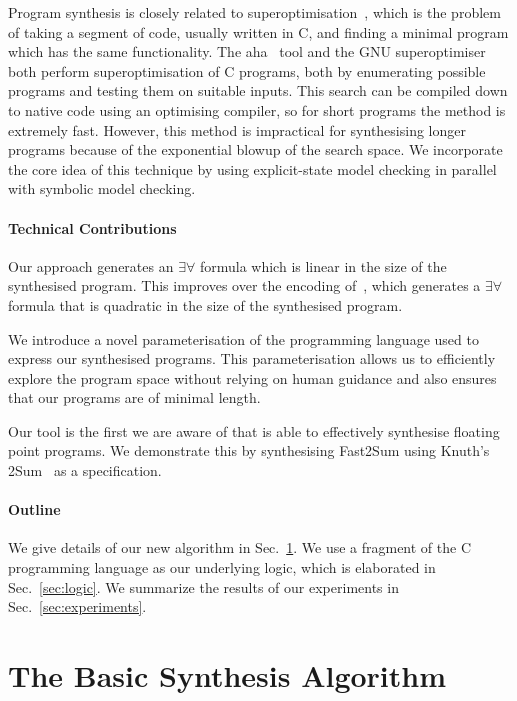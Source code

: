 \documentclass[a4paper]{llncs}
\begin{document}
Program synthesis is closely related to
superoptimisation~\cite{superoptimisation}, which is the problem of taking a
segment of code, usually written in C, and finding a minimal program which
has the same functionality.  The {\sc aha}~\cite{aha} tool and the GNU
superoptimiser~\cite{gnu-superoptimiser} both perform superoptimisation of C
programs, both by enumerating possible programs and testing them on suitable
inputs.  This search can be compiled down to native code using an optimising
compiler, so for short programs the method is extremely fast.  However, this
method is impractical for synthesising longer programs because of the
exponential blowup of the search space.  We incorporate the core idea of
this technique by using explicit-state model checking in parallel with
symbolic model checking.

\paragraph{Technical Contributions}
Our approach generates an $\exists \forall$ formula which is linear
in the size of the synthesised program.  This improves over the
encoding of~\cite{brahma}, which generates a $\exists \forall$ formula
that is quadratic in the size of the synthesised program.

We introduce a novel parameterisation of the programming language
used to express our synthesised programs.
This parameterisation allows us to efficiently explore the program space
without relying on human guidance and also ensures that our programs
are of minimal length.

Our tool is the first we are aware of that is able to effectively
synthesise floating point programs.  We demonstrate this by
synthesising {\sc Fast2Sum} using Knuth's {\sc 2Sum}~\cite{taocp2} as
a specification.

\paragraph{Outline} We give details of our new algorithm in
Sec.~\ref{sec:algorithm}.  We use a fragment of the C programming language
as our underlying logic, which is elaborated in Sec.~\ref{sec:logic}. We
summarize the results of our experiments in Sec.~\ref{sec:experiments}.

\section{The Basic Synthesis Algorithm}
\label{sec:algorithm}
\end{document}

